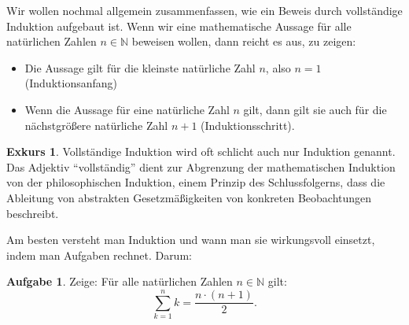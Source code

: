 \documentclass[a4paper,ngerman,12pt]{scrartcl}
\newcommand{\N}{\mathbb{N}}
\theoremstyle{definition}
\newtheorem*{aufg}{Aufgabe}
\newtheorem*{exk}{Exkurs}
\newenvironment{exkurs}{\begin{shaded}\begin{exk}}{\end{exk}\end{shaded}}
\begin{document}
Wir wollen nochmal allgemein zusammenfassen, wie ein Beweis durch vollständige Induktion aufgebaut ist. Wenn wir eine mathematische Aussage für alle natürlichen Zahlen $n \in \N$ beweisen wollen, dann reicht es aus, zu zeigen:

\begin{itemize}
  \item Die Aussage gilt für die kleinste natürliche Zahl $n$, also $n=1$ (Induktionsanfang)
  \item Wenn die Aussage für eine natürliche Zahl $n$ gilt, dann gilt sie auch für die nächstgrößere natürliche Zahl $n+1$ (Induktionsschritt).
\end{itemize}

\begin{exkurs}
  Vollständige Induktion wird oft schlicht auch nur Induktion genannt. Das Adjektiv "`vollständig"' dient zur Abgrenzung der mathematischen Induktion von der philosophischen Induktion, einem Prinzip des Schlussfolgerns, dass die Ableitung von abstrakten Gesetzmäßigkeiten von konkreten Beobachtungen beschreibt.
\end{exkurs}

Am besten versteht man Induktion und wann man sie wirkungsvoll einsetzt, indem man Aufgaben rechnet. Darum:

\begin{aufg}
  Zeige: Für alle natürlichen Zahlen $n \in \N$ gilt:
  \[ \sum\limits_{k=1}^n k = \frac{n \cdot (n+1)}{2}. \]
\end{aufg}

\end{document}
